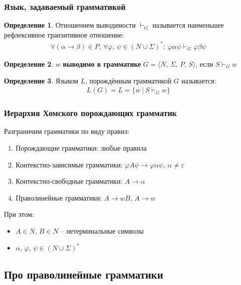 \documentclass[a4paper,12pt]{article}
\renewcommand{\phi}{\ensuremath{\varphi}}
\theoremstyle{plain}
\theoremstyle{definition}
\newtheorem{definition}{Определение}[subsection]
\theoremstyle{remark}
\begin{document}
\subsubsection*{Язык, задаваемый грамматикой}
\begin{definition}
	Отношением выводимости $\vdash_G$ называется наименьшее рефлексивное транзитивное отношение:
	\begin{align*}
		\forall (\alpha \to \beta) \in P,\, \forall \phi,\, \psi \in (N \cup \Sigma)^* :\: \phi\alpha\psi \vdash_G \phi\beta\psi
	\end{align*}
\end{definition}

\begin{definition}
	$w$ \textbf{выводимо в грамматике} $G = \langle N,\, \Sigma,\, P,\, S\rangle$, если $S \vdash_G w$
\end{definition}

\begin{definition}
	Языком $L$, порождённым грамматикой $G$ называется:
	\begin{align*}
		L(G) = L = \{w \:|\: S \vdash_G w\}
	\end{align*}
\end{definition}

\subsubsection*{Иерархия Хомского порождающих грамматик}
Разграничим грамматики по виду правил:
\begin{enumerate}
	\item Порождающие грамматики: любые правила
	\item Контекстно-зависимые грамматики: $\phi A \psi \to \phi\alpha\psi,\, \alpha \neq \varepsilon$
	\item Контекстно-свободные грамматики: $A \to \alpha$
	\item Праволинейные грамматики: $A \to wB,\, A \to w$
\end{enumerate}

При этом:
\begin{itemize}
	\item $A \in N,\, B \in N$ -- нетерминальные символы
	\item $\alpha,\, \phi,\, \psi \in (N \cup \Sigma)^*$
\end{itemize}

\subsection{Про праволинейные грамматики}
\end{document}
